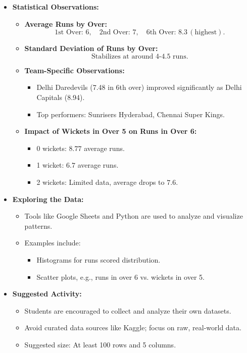 \documentclass{article}
\begin{document}
\begin{itemize}
  \item \textbf{Statistical Observations:}
    \begin{itemize}
      \item \textbf{Average Runs by Over:}
        \[
          \text{1st Over: } 6, \quad \text{2nd Over: } 7, \quad \text{6th Over: } 8.3 \, (\text{highest}).
        \]
      \item \textbf{Standard Deviation of Runs by Over:}
        \[
          \text{Stabilizes at around 4-4.5 runs}.
        \]
      \item \textbf{Team-Specific Observations:}
        \begin{itemize}
          \item Delhi Daredevils (7.48 in 6th over) improved significantly as Delhi Capitals (8.94).
          \item Top performers: Sunrisers Hyderabad, Chennai Super Kings.
        \end{itemize}
      \item \textbf{Impact of Wickets in Over 5 on Runs in Over 6:}
        \begin{itemize}
          \item 0 wickets: $8.77$ average runs.
          \item 1 wicket: $6.7$ average runs.
          \item 2 wickets: Limited data, average drops to $7.6$.
        \end{itemize}
    \end{itemize}

  \item \textbf{Exploring the Data:}
    \begin{itemize}
      \item Tools like Google Sheets and Python are used to analyze and visualize patterns.
      \item Examples include:
        \begin{itemize}
          \item Histograms for runs scored distribution.
          \item Scatter plots, e.g., runs in over 6 vs. wickets in over 5.
        \end{itemize}
    \end{itemize}

  \item \textbf{Suggested Activity:}
    \begin{itemize}
      \item Students are encouraged to collect and analyze their own datasets.
      \item Avoid curated data sources like Kaggle; focus on raw, real-world data.
      \item Suggested size: At least 100 rows and 5 columns.
    \end{itemize}
\end{itemize}
\end{document}
